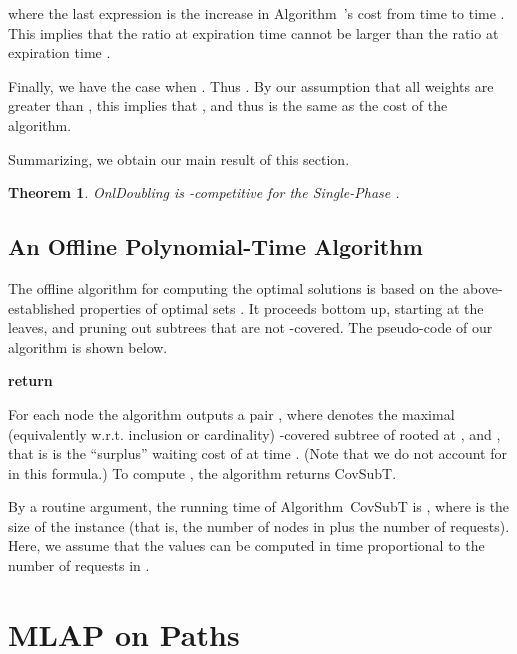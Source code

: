 \documentclass[a4paper]{article}
\newtheorem{theorem}{Theorem}[section]
\newcommand{\algDoubling}{\mbox{\sc OnlDoubling}}
\newcommand{\algCovSubT}{\mbox{\sc CovSubT}}
\newcommand{\MLAP}{\mbox{\rm\textsf{MLAP}}}
\begin{document}
where the last expression is the increase in Algorithm~'s cost from time
 to time . This implies that the ratio at expiration time  cannot be larger than the
ratio at expiration time .

Finally, we have the case when . Thus . By our assumption that all
weights are greater than , this implies that , and thus
 is the same as the cost of the algorithm.


Summarizing, we obtain our main result of this section.

\begin{theorem}\label{thm:doubling-for-phase}
	{\algDoubling} is -competitive for the Single-Phase .
\end{theorem}




\subsection{An Offline Polynomial-Time Algorithm}
\label{sec: 1p-mlap with deadlines}

The offline algorithm for computing the optimal solutions is based on
the above-established properties of optimal sets .
It proceeds bottom up,
starting at the leaves, and pruning out subtrees that are not
-covered.  The pseudo-code of our algorithm is shown below.


\begin{algorithm}[ht]
\caption{{\algCovSubT}}\label{alg:paidsubtree}
\begin{algorithmic}[0]
\State 
\State 
{}
    \State 
	\If{}
    	\State 
    	\State 
	\EndIf
\EndFor
\State \textbf{return} 
\end{algorithmic}
\end{algorithm}


For each node  the algorithm outputs a pair
, where  denotes the maximal (equivalently w.r.t. inclusion or cardinality)
-covered subtree of  rooted at , and 
, that
is  is the ``surplus'' waiting cost of  at time . (Note that
we do not account for  in this formula.)
To compute , the algorithm returns {\algCovSubT}.

By a routine argument, the running time of Algorithm~{\algCovSubT} is
, where  is the size of the instance (that is, the number of nodes
in  plus the number of requests). Here, we assume that the
values  can be computed in time proportional to the number of
requests in .




\section{{\MLAP} on Paths}
\label{sec: mlap on paths}
\end{document}
